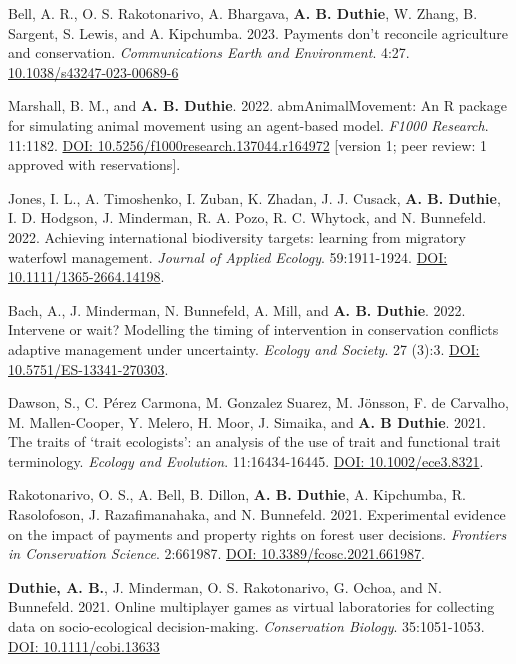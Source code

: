 \documentclass[letterpaper]{article}
\begin{document}
\begin{etaremune}
\item Bell, A. R., O. S. Rakotonarivo, A. Bhargava, {\bf A. B. Duthie}, W. Zhang, B. Sargent, S. Lewis, and A. Kipchumba. 2023. Payments don't reconcile agriculture and conservation. {\it Communications Earth and Environment}. 4:27. \href{https://www.nature.com/articles/s43247-023-00689-6}{10.1038/s43247-023-00689-6}
\item Marshall, B. M., and {\bf A. B. Duthie}. 2022. abmAnimalMovement: An R package for simulating animal movement using an agent-based model. {\it F1000 Research}. 11:1182. \newline \href{https://doi.org/10.5256/f1000research.137044.r164972}{DOI: 10.5256/f1000research.137044.r164972} [version 1; peer review: 1 approved with reservations].
\item Jones, I. L., A. Timoshenko, I. Zuban, K. Zhadan, J. J. Cusack, {\bf A. B. Duthie}, I. D. Hodgson, J. Minderman, R. A. Pozo, R. C. Whytock, and N. Bunnefeld. 2022. Achieving international biodiversity targets: learning from migratory waterfowl management. {\it Journal of Applied Ecology}. 59:1911-1924. \href{https://besjournals.onlinelibrary.wiley.com/doi/10.1111/1365-2664.14198}{DOI: 10.1111/1365-2664.14198}.
\item Bach, A., J. Minderman, N. Bunnefeld, A. Mill, and {\bf A. B. Duthie}. 2022. Intervene or wait? Modelling the timing of intervention in conservation conflicts adaptive management under uncertainty. {\it Ecology and Society}. 27 (3):3. \href{https://ecologyandsociety.org/vol27/iss3/art3/}{DOI: 10.5751/ES-13341-270303}.
\item Dawson, S., C. P\'{e}rez Carmona, M. Gonzalez Suarez, M. J\"{o}nsson, F. de Carvalho, M. Mallen-Cooper, Y. Melero, H. Moor, J. Simaika, and {\bf A. B Duthie}. 2021. The traits of `trait ecologists': an analysis of the use of trait and functional trait terminology. {\it Ecology and Evolution}. 11:16434-16445. \href{https://onlinelibrary.wiley.com/doi/10.1002/ece3.8321}{DOI: 10.1002/ece3.8321}.
\item Rakotonarivo, O. S., A. Bell, B. Dillon, {\bf A. B. Duthie}, A. Kipchumba, R. Rasolofoson, J. Razafimanahaka, and N. Bunnefeld. 2021. Experimental evidence on the impact of payments and property rights on forest user decisions. {\it Frontiers in Conservation Science}. 2:661987. \href{https://doi.org/10.3389/fcosc.2021.661987}{DOI: 10.3389/fcosc.2021.661987}.
\item {\bf Duthie, A. B.}, J. Minderman, O. S. Rakotonarivo, G. Ochoa, and N. Bunnefeld. 2021. Online multiplayer games as virtual laboratories for collecting data on socio-ecological decision-making. {\it Conservation Biology}. 35:1051-1053. \href{https://doi.org/10.1111/cobi.13633}{DOI: 10.1111/cobi.13633}

\end{etaremune}
\end{document}
